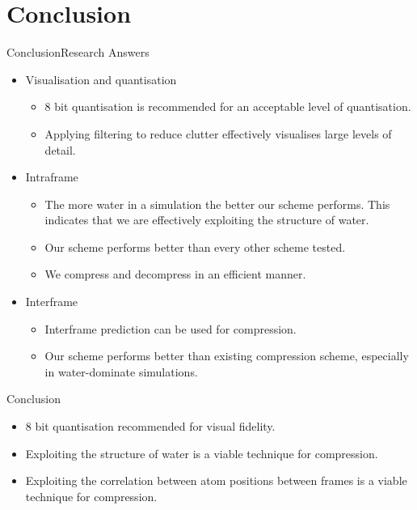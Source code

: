 \documentclass{beamer}
\begin{document}
\section{Conclusion}
\begin{frame}{Conclusion}{Research Answers}

  \begin{itemize}

  \item Visualisation and quantisation
    \begin{itemize}
    \item 8 bit quantisation is recommended for an acceptable level of
      quantisation.
    \item Applying filtering to reduce clutter effectively visualises large
      levels of detail.
    \end{itemize}

  \item Intraframe
    \begin{itemize}
    \item The more water in a simulation the better our scheme performs. This
      indicates that we are effectively exploiting the structure of water.
    \item Our scheme performs better than every other scheme tested.
    \item We compress and decompress in an efficient manner.
    \end{itemize}

  \item Interframe
    \begin{itemize}
      \item Interframe prediction can be used for compression.
      \item Our scheme performs better than existing compression scheme,
        especially in water-dominate simulations.
    \end{itemize}

  \end{itemize}
\end{frame}

\begin{frame}{Conclusion}

\begin{itemize}
 \item 8 bit quantisation recommended for visual fidelity.
 \item Exploiting the structure of water is a viable technique for compression.
 \item Exploiting the correlation between atom positions between frames is a viable technique for compression.
\end{itemize}

\end{frame}
\end{document}
